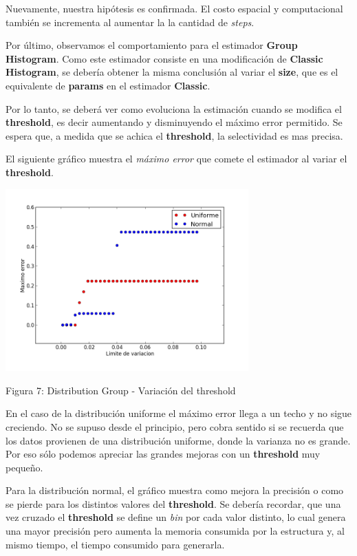 \documentclass[10pt, a4paper,english,spanish,hidelinks]{article}
\begin{document}
Nuevamente, nuestra hipótesis es confirmada. El costo espacial y computacional también se incrementa al aumentar la 
la cantidad de \textit{steps}.

Por último, observamos el comportamiento para el estimador \textbf{Group Histogram}. 
Como este estimador consiste en una modificación de \textbf{Classic Histogram}, se debería obtener la misma
conclusión al variar el \textbf{size}, que es el equivalente de \textbf{params} en el estimador \textbf{Classic}.

Por lo tanto, se deberá ver como evoluciona la estimación cuando se modifica el
\textbf{threshold}, es decir aumentando y disminuyendo el máximo error permitido.
Se espera que, a medida que se achica el \textbf{threshold}, la selectividad es mas precisa.

El siguiente gráfico muestra el \textit{máximo error} que comete el estimador
al variar el \textbf{threshold}.
\centerline{  \includegraphics[width=0.7\textwidth]{./imagenes/ejb2_group_parameter_variation.png}}
\centerline{Figura 7: Distribution Group - Variación del threshold}



En el caso de la distribución uniforme el máximo error llega a un
techo y no sigue creciendo. No se supuso desde el principio, pero cobra sentido si
se recuerda que los datos provienen de una distribución uniforme, donde la varianza no es
grande. Por eso sólo podemos apreciar las grandes mejoras con un \textbf{threshold} muy pequeño.

Para la distribución normal, el gráfico muestra como mejora la precisión o como se pierde
para los distintos valores del \textbf{threshold}. Se debería recordar, que una vez cruzado el
\textbf{threshold} se define un \textit{bin} por cada valor distinto, lo cual genera una mayor
precisión pero aumenta la memoria consumida por la estructura y, al mismo tiempo, el tiempo
consumido para generarla.
\end{document}
